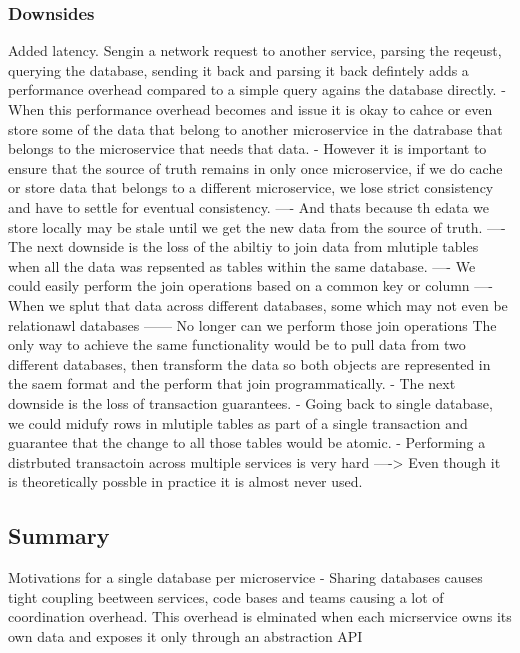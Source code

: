 \documentclass[a4paper, 11pt]{book}
\begin{document}
{    \subsubsection{Downsides}
    Added latency. Sengin a network request to another service, parsing the reqeust, querying the database, sending it back and parsing it back defintely adds a performance overhead compared to a simple query agains the database directly.
    - When this performance overhead becomes and issue it is okay to cahce or even store some of the data that belong to another microservice in the datrabase that belongs to the microservice that needs that data.
    - However it is important to ensure that the source of truth remains in only once microservice, if we do cache or store data that belongs to a different microservice, we lose strict consistency and have to settle for eventual consistency.
    ---- And thats because th edata we store locally may be stale until we get the new data from the source of truth.
    ---- The next downside is the loss of the abiltiy to join data from mlutiple tables when all the data was repsented as tables within the same database.
    ---- We could easily perform the join operations based on a common key or column
    ---- When we splut that data across different databases, some which may not even be relationawl databases
    ------ No longer can we perform those join operations
    The only way to achieve the same functionality would be to pull data from two different databases, then transform the data so both objects are represented in the saem format and the perform that join programmatically.
    - The next downside is the loss of transaction guarantees.
    - Going back to single database, we could midufy rows in mlutiple tables as part of a single transaction and guarantee that the change to all those tables would be atomic.
    - Performing a distrbuted transactoin across multiple services is very hard
    ----> Even though it is theoretically possble in practice it is almost never used.

    \subsection{Summary}
    Motivations for a single database per microservice
    - Sharing databases causes tight coupling beetween services, code bases and teams causing a lot of coordination overhead.
    This overhead is elminated when each micrservice owns its own data and exposes it only through an abstraction API

}
\end{document}

